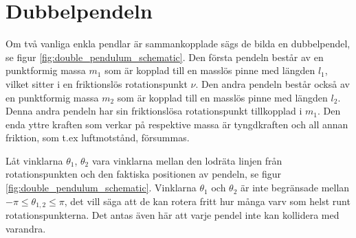 \section{Dubbelpendeln}
Om två vanliga enkla pendlar är sammankopplade sägs de bilda en dubbelpendel, se figur \ref{fig:double_pendulum_schematic}. Den första pendeln består av en punktformig massa $m_1$ som är kopplad till en masslös pinne med längden $l_1$, vilket sitter i en friktionslös rotationspunkt $\nu$. Den andra pendeln består också av en punktformig massa $m_2$ som är kopplad till en masslös pinne med längden $l_2$. Denna andra pendeln har sin friktionslösa rotationspunkt tillkopplad i $m_1$. Den enda yttre kraften som verkar på respektive massa är tyngdkraften och all annan friktion, som t.ex luftmotstånd, försummas.

Låt vinklarna $\theta_1$, $\theta_2$ vara vinklarna mellan den lodräta linjen från rotationspunkten och den faktiska positionen av pendeln, se figur \ref{fig:double_pendulum_schematic}. Vinklarna $\theta_1$ och $\theta_2$ är inte begränsade mellan $-\pi \leq \theta_{1,2} \leq \pi$, det vill säga att de kan rotera fritt hur många varv som helst runt rotationspunkterna. Det antas även här att varje pendel inte kan kollidera med varandra. 

